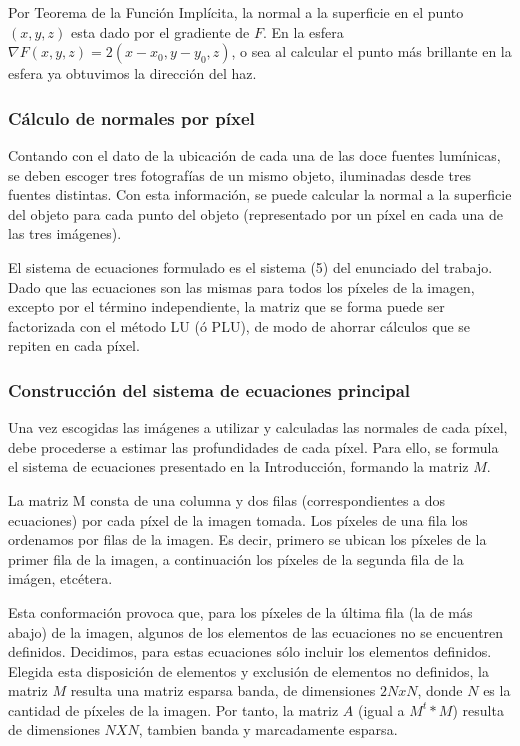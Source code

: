 Por Teorema de la Funci\'on Impl\'icita, la normal a la superficie en el punto $(x,y,z)$ esta dado por el gradiente de $F$. En la esfera $\nabla F(x,y,z) = 2(x-x_0,y-y_0,z)$, o sea al calcular el punto m\'as brillante en la esfera ya obtuvimos la direcci\'on del haz.

\subsubsection {C\'alculo de normales por p\'ixel}

Contando con el dato de la ubicación de cada una de las doce fuentes lumínicas, se deben escoger tres fotografías de un mismo objeto, iluminadas desde tres fuentes distintas. Con esta información, se puede calcular la normal a la superficie del objeto para cada punto del objeto (representado por un píxel en cada una de las tres imágenes).

El sistema de ecuaciones formulado es el sistema (5) del enunciado del trabajo. 
Dado que las ecuaciones son las mismas para todos los píxeles de la imagen, excepto por el término independiente, la matriz que se forma puede ser factorizada con el método LU (ó PLU), de modo de ahorrar cálculos que se repiten en cada píxel.

\subsubsection{Construcci\'on del sistema de ecuaciones principal}

Una vez escogidas las im\'agenes a utilizar y calculadas las normales de cada p\'ixel, debe procederse a estimar las profundidades de cada p\'ixel. Para ello, se formula el sistema de ecuaciones presentado en la Introducci\'on, formando la matriz $M$.

La matriz M consta de una columna y dos filas (correspondientes a dos ecuaciones) por cada p\'ixel de la imagen tomada. Los p\'ixeles de una fila los ordenamos por filas de la imagen. Es decir, primero se ubican los p\'ixeles de la primer fila de la imagen, a continuaci\'on los p\'ixeles de la segunda fila de la im\'agen, etc\'etera.

Esta conformaci\'on provoca que, para los p\'ixeles de la \'ultima fila (la de m\'as abajo) de la imagen, algunos de los elementos de las ecuaciones no se encuentren definidos. Decidimos, para estas ecuaciones s\'olo incluir los elementos definidos.
Elegida esta disposici\'on de elementos y exclusi\'on de elementos no definidos, la matriz $M$ resulta una matriz esparsa banda, de dimensiones $2NxN$, donde $N$ es la cantidad de p\'ixeles de la imagen.
Por tanto, la matriz $A$ (igual a $M^t * M$) resulta de dimensiones $N X N$, tambien banda y marcadamente esparsa.

